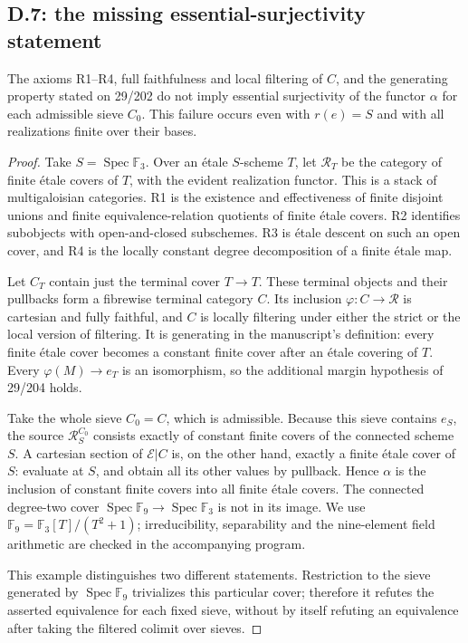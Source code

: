\subsection{D.7: the missing essential-surjectivity statement}

\begin{proposition}
\label{D:alpha-counterexample}
The axioms R1--R4, full faithfulness and local filtering of $C$, and
the generating property stated on 29/202 do not imply essential
surjectivity of the functor $\alpha$ for each admissible sieve $C_0$.
This failure occurs even with $r(e)=S$ and with all realizations finite
over their bases.
\end{proposition}
\begin{proof}
Take $S=\operatorname{Spec}\mathbb F_3$. Over an \'etale $S$-scheme
$T$, let $\mathscr R_T$ be the category of finite \'etale covers of
$T$, with the evident realization functor. This is a stack of
multigaloisian categories. R1 is the existence and effectiveness of
finite disjoint unions and finite equivalence-relation quotients of
finite \'etale covers. R2 identifies subobjects with open-and-closed
subschemes. R3 is \'etale descent on such an open cover, and R4 is
the locally constant degree decomposition of a finite \'etale map.

Let $C_T$ contain just the terminal cover $T\to T$. These terminal
objects and their pullbacks form a fibrewise terminal category $C$.
Its inclusion $\varphi:C\to\mathscr R$ is cartesian and fully
faithful, and $C$ is locally filtering under either the strict or the
local version of filtering. It is generating in the manuscript's
definition: every finite \'etale cover becomes a constant finite
cover after an \'etale covering of $T$. Every $\varphi(M)\to e_T$
is an isomorphism, so the additional margin hypothesis of 29/204 holds.

Take the whole sieve $C_0=C$, which is admissible. Because this sieve
contains $e_S$, the source $\mathscr R_S^{C_0}$ consists exactly of
constant finite covers of the connected scheme $S$. A cartesian section
of $\mathcal E|C$ is, on the other hand, exactly a finite \'etale
cover of $S$: evaluate at $S$, and obtain all its other values by
pullback. Hence $\alpha$ is the inclusion of constant finite covers
into all finite \'etale covers. The connected degree-two cover
$\operatorname{Spec}\mathbb F_9\to\operatorname{Spec}\mathbb F_3$
is not in its image. We use $\mathbb F_9=\mathbb F_3[T]/(T^2+1)$;
irreducibility, separability and the nine-element field arithmetic are
checked in the accompanying program.

This example distinguishes two different statements. Restriction to
the sieve generated by $\operatorname{Spec}\mathbb F_9$ trivializes
this particular cover; therefore it refutes the asserted equivalence
for each fixed sieve, without by itself refuting an equivalence after
taking the filtered colimit over sieves.
\end{proof}

